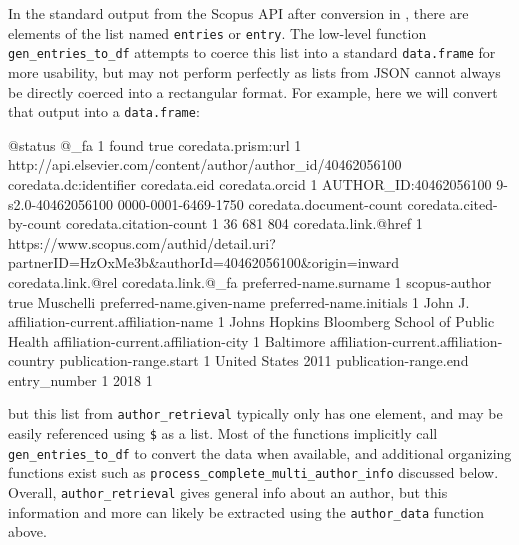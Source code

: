 In the standard output from the Scopus API after conversion in
, there are elements of the list named \texttt{entries} or
\texttt{entry}. The low-level function \texttt{gen\_entries\_to\_df}
attempts to coerce this list into a standard \texttt{data.frame} for
more usability, but may not perform perfectly as lists from JSON cannot
always be directly coerced into a rectangular format. For example, here
we will convert that output into a \texttt{data.frame}:

\begin{Schunk}
\begin{Soutput}
  @status @_fa
1   found true
                                            coredata.prism:url
1 http://api.elsevier.com/content/author/author_id/40462056100
  coredata.dc:identifier       coredata.eid      coredata.orcid
1  AUTHOR_ID:40462056100 9-s2.0-40462056100 0000-0001-6469-1750
  coredata.document-count coredata.cited-by-count coredata.citation-count
1                      36                     681                     804
                                                                             coredata.link.@href
1 https://www.scopus.com/authid/detail.uri?partnerID=HzOxMe3b&authorId=40462056100&origin=inward
  coredata.link.@rel coredata.link.@_fa preferred-name.surname
1      scopus-author               true              Muschelli
  preferred-name.given-name preferred-name.initials
1                      John                      J.
             affiliation-current.affiliation-name
1 Johns Hopkins Bloomberg School of Public Health
  affiliation-current.affiliation-city
1                            Baltimore
  affiliation-current.affiliation-country publication-range.start
1                           United States                    2011
  publication-range.end entry_number
1                  2018            1
\end{Soutput}
\end{Schunk}

but this list from \texttt{author\_retrieval} typically only has one
element, and may be easily referenced using \texttt{\$} as a list. Most
of the functions implicitly call \texttt{gen\_entries\_to\_df} to
convert the data when available, and additional organizing functions
exist such as \texttt{process\_complete\_multi\_author\_info} discussed
below. Overall, \texttt{author\_retrieval} gives general info about an
author, but this information and more can likely be extracted using the
\texttt{author\_data} function above.

